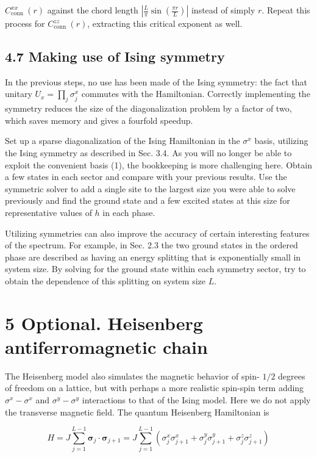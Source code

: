 \documentclass[12pt]{article}
\begin{document}
$C_{\text {conn }}^{x x}(r)$ against the chord length $\left|\frac{L}{\pi} \sin \left(\frac{\pi r}{L}\right)\right|$ instead of simply $r$. Repeat this process for $C_{\text {conn }}^{z z}(r)$, extracting this critical exponent as well.

\subsection*{4.7 Making use of Ising symmetry}
In the previous steps, no use has been made of the Ising symmetry: the fact that unitary $U_{x}=\prod_{j} \sigma_{j}^{x}$ commutes with the Hamiltonian. Correctly implementing the symmetry reduces the size of the diagonalization problem by a factor of two, which saves memory and gives a fourfold speedup.

Set up a sparse diagonalization of the Ising Hamiltonian in the $\sigma^{x}$ basis, utilizing the Ising symmetry as described in Sec. 3.4. As you will no longer be able to exploit the convenient basis (1), the bookkeeping is more challenging here. Obtain a few states in each sector and compare with your previous results. Use the symmetric solver to add a single site to the largest size you were able to solve previously and find the ground state and a few excited states at this size for representative values of $h$ in each phase.

Utilizing symmetries can also improve the accuracy of certain interesting features of the spectrum. For example, in Sec. 2.3 the two ground states in the ordered phase are described as having an energy splitting that is exponentially small in system size. By solving for the ground state within each symmetry sector, try to obtain the dependence of this splitting on system size $L$.

\section*{5 Optional. Heisenberg antiferromagnetic chain}
The Heisenberg model also simulates the magnetic behavior of spin- $1 / 2$ degrees of freedom on a lattice, but with perhaps a more realistic spin-spin term adding $\sigma^{x}-\sigma^{x}$ and $\sigma^{y}-\sigma^{y}$ interactions to that of the Ising model. Here we do not apply the transverse magnetic field. The quantum Heisenberg Hamiltonian is


\begin{equation*}
H=J \sum_{j=1}^{L-1} \boldsymbol{\sigma}_{j} \cdot \boldsymbol{\sigma}_{j+1}=J \sum_{j=1}^{L-1}\left(\sigma_{j}^{x} \sigma_{j+1}^{x}+\sigma_{j}^{y} \sigma_{j+1}^{y}+\sigma_{j}^{z} \sigma_{j+1}^{z}\right) \tag{12}
\end{equation*}
\end{document}
